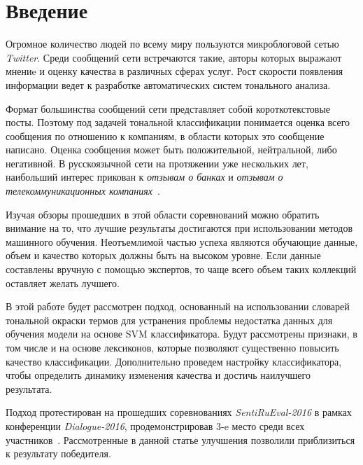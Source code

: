 \section{Введение}
Огромное количество людей по всему миру пользуются микроблоговой сетью
{\it Twitter}.
Среди сообщений сети встречаются такие, авторы которых выражают мнениe и оценку
качества в различных сферах услуг.
Рост скорости появления информации ведет к разработке автоматических систем
тонального анализа.

Формат большинства сообщений сети представляет собой короткотекстовые посты.
Поэтому под задачей тональной классификации понимается оценка всего
сообщения по отношению к компаниям, в области которых это сообщение написано.
Оценка сообщения может быть положительной, нейтральной, либо негативной.
В русскоязычной сети на протяжении уже нескольких лет, наибольший интерес прикован к
{\it отзывам о банках} и {\it отзывам о телекоммуникационных компаниях}~\cite{tonalityAnalysis}.

Изучая обзоры прошедших в этой области соревнований \cite{dialog2015, dialog2016}
можно обратить внимание на то, что лучшие результаты достигаются при использовании
методов машинного обучения.
Неотъемлимой частью успеха являются обучающие данные, объем и качество которых
должны быть на высоком уровне.
Если данные составлены вручную с помощью экспертов, то чаще всего
объем таких коллекций оставляет желать лучшего.

В этой работе будет рассмотрен подход, основанный на использовании
словарей тональной окраски термов для устранения проблемы недостатка
данных для обучения модели на основе SVM классификатора.
Будут рассмотрены признаки, в том числе и на основе лексиконов, которые позволяют
существенно повысить качество классификации.
Дополнительно проведем настройку классификатора, чтобы определить динамику
изменения качества и достичь наилучшего результата.

Подход протестирован на прошедших соревнованиях {\it SentiRuEval-2016}
в рамках конференции {\it Dialogue-2016},
продемонстрировав 3-e место среди всех участников~\cite{dialog2016}.
Рассмотренные в данной статье улучшения позволили приблизиться к результату
победителя.
